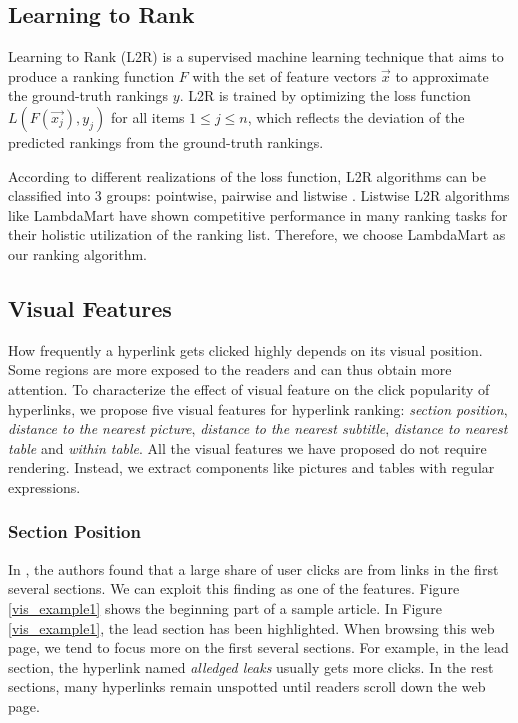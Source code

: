 \subsection{Learning to Rank}

Learning to Rank (L2R) is a supervised machine learning technique that aims to produce a ranking function $F$ with the set of feature vectors $\vec{x}$ to approximate the ground-truth rankings $y$. L2R is trained by optimizing the loss function $L(F(\vec{x_j}), y_j)$ for all items $1 \leq j \leq n$, which reflects the deviation of the predicted rankings from the ground-truth rankings. 

According to different realizations of the loss function, L2R algorithms can be classified into 3 groups: pointwise, pairwise and listwise \cite{liu2011learning}. Listwise L2R algorithms like LambdaMart \cite{wu2010adapting} have shown competitive performance in many ranking tasks for their holistic utilization of the ranking list. Therefore, we choose LambdaMart as our ranking algorithm. 

\subsection{Visual Features} \label{sec_vis_feature}

How frequently a hyperlink gets clicked highly depends on its visual position. Some regions are more exposed to the readers and can thus obtain more attention. To characterize the effect of visual feature on the click popularity of hyperlinks, we propose five visual features for hyperlink ranking: \emph{section position}, \emph{distance to the nearest picture}, \emph{distance to the nearest subtitle}, \emph{distance to nearest table} and \emph{within table}. All the visual features we have proposed do not require rendering. Instead, we extract components like pictures and tables with regular expressions.

\subsubsection{Section Position}

In \cite{lamprecht2017structure}, the authors found that a large share of user clicks are from links in the first several sections. We can exploit this finding as one of the features. Figure \ref{vis_example1} shows the beginning part of a sample article. In Figure \ref{vis_example1}, the lead section has been highlighted. When browsing this web page, we tend to focus more on the first several sections. For example, in the lead section, the hyperlink named \emph{alledged leaks} usually gets more clicks. In the rest sections, many hyperlinks remain unspotted until readers scroll down the web page. 

